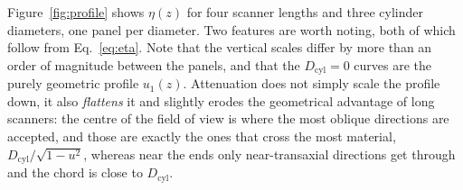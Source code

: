 \documentclass[11pt,a4paper]{article}
\newcommand{\Lpet}{L_{\mathrm{PET}}}
\newcommand{\Dpet}{D_{\mathrm{PET}}}
\newcommand{\Dcyl}{D_{\mathrm{cyl}}}
\DeclarePairedDelimiter{\abs}{\lvert}{\rvert}
\begin{document}


Figure~\ref{fig:profile} shows $\eta(z)$ for four scanner lengths and three cylinder
diameters, one panel per diameter. Two features are worth noting, both of which follow
from Eq.~\eqref{eq:eta}. Note that the vertical scales differ by more than an order of
magnitude between the panels, and that the $\Dcyl=0$ curves are the purely geometric
profile $u_1(z)$. Attenuation does not simply scale the profile down, it also
\emph{flattens} it and slightly erodes the geometrical advantage of long scanners: the
centre of the field of view is where the most oblique directions are accepted, and those are
exactly the ones that cross the most material, $\Dcyl/\sqrt{1-u^{2}}$, whereas near the ends
only near-transaxial directions get through and the chord is close to $\Dcyl$.


\end{document}
